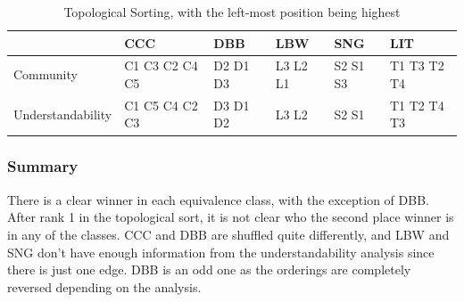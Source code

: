 \begin{table}
\centering
\caption{Topological Sorting, with the left-most position being highest \label{topologicalResults}}
\begin{tabular}{|| l || l || l || l || l || l ||}
				& CCC			& DBB 		& LBW & SNG & LIT \\ \hline
Community 		& C1 C3 C2 C4 C5 	& D2 D1 D3	&  L3 L2 L1 	& S2 S1 S3 	& T1 T3 T2 T4 \\  
Understandability 	& C1 C5 C4 C2 C3 	& D3 D1 D2 	& L3 L2		& S2 S1		& T1 T2 T4 T3 \\ 

\end{tabular}
\end{table}

\subsubsection{Summary}
There is a clear winner in each equivalence class, with the exception of DBB. After rank 1 in the topological sort, it is not clear who the second place winner is in any of the classes. CCC and DBB are shuffled quite differently, and LBW and SNG don't have enough information from the understandability analysis since there is just one edge. DBB is an odd one as the orderings are completely reversed depending on the analysis. 









